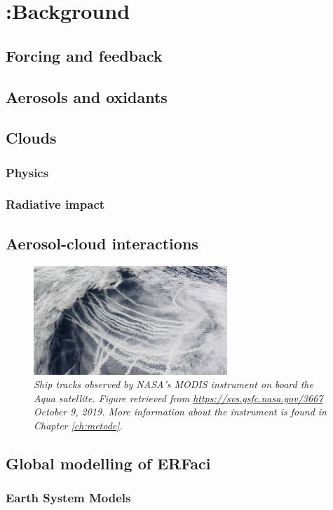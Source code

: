 \chapter[Background]{{\color{red} :}Background}
%
\label{ch:background}

\section{Forcing and feedback}\label{ch:forcefeed}

\section{Aerosols and oxidants}

\section{Clouds}
\subsection{Physics}

\subsection{Radiative impact}

\section{Aerosol-cloud interactions}
\begin{figure}
\centering
    \includegraphics[width=0.65\textwidth]{figurer/ship_tracks.jpg}
\caption{\textit{Ship tracks observed by NASA's MODIS instrument on board the Aqua satellite. Figure retrieved from \url{https://svs.gsfc.nasa.gov/3667} October 9, 2019. More information about the instrument is found in Chapter \ref{ch:metode}.}}
\label{fig:shiptracks}
\end{figure}
\cite{glasius_composition_2018}

\section{Global modelling of ERFaci}
\subsection{Earth System Models}



